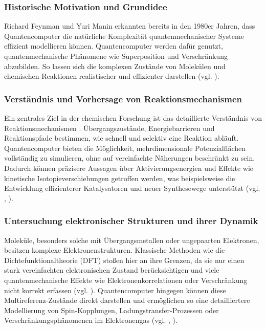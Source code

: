 \subsubsection{Historische Motivation und Grundidee}
{Richard Feynman und Yuri Manin erkannten bereits in den 1980er Jahren, dass Quantencomputer die natürliche Komplexität quantenmechanischer Systeme effizient modellieren können. Quantencomputer werden dafür genutzt, quantenmechanische Phänomene wie Superposition und Verschränkung abzubilden. So lassen sich die komplexen Zustände von Molekülen und chemischen Reaktionen realistischer und effizienter darstellen (vgl. \cite{feynmanSimulatingPhysicsComputers1982}).}


\subsubsection{Verständnis und Vorhersage von Reaktionsmechanismen}

Ein zentrales Ziel in der chemischen Forschung ist das detaillierte Verständnis von Reaktionsmechanismen . Übergangszustände, Energiebarrieren und Reaktionspfade bestimmen, wie schnell und selektiv eine Reaktion abläuft. Quantencomputer bieten die Möglichkeit, mehrdimensionale Potenzialflächen vollständig zu simulieren, ohne auf vereinfachte Näherungen beschränkt zu sein. Dadurch können präzisere Aussagen über Aktivierungsenergien und Effekte wie kinetische Isotopieverschiebungen getroffen werden, was beispielsweise die Entwicklung effizienterer Katalysatoren und neuer Synthesewege unterstützt (vgl. \cite{liu_quantum_2020}, \cite{mcardle_quantum_2020}).

\subsubsection{Untersuchung elektronischer Strukturen und ihrer Dynamik}
Moleküle, besonders solche mit Übergangsmetallen oder ungepaarten Elektronen, besitzen komplexe Elektronenstrukturen. Klassische Methoden wie die Dichtefunktionaltheorie (DFT) stoßen hier an ihre Grenzen, da sie nur einen stark vereinfachten elektronischen Zustand berücksichtigen und viele quantenmechanische Effekte wie Elektronenkorrelationen oder Verschränkung nicht korrekt erfassen (vgl. \cite{weidman_quantum_2024}). Quantencomputer hingegen können diese Multireferenz-Zustände direkt darstellen und ermöglichen so eine detailliertere Modellierung von Spin-Kopplungen, Ladungstransfer-Prozessen oder Verschränkungsphänomenen im Elektronengas (vgl. \cite{bauer_quantum_2020}, \cite{mcardle_quantum_2020}).

